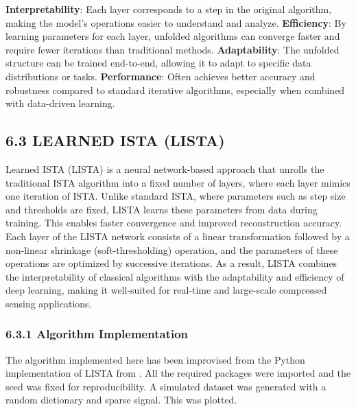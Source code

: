 \documentclass[
  letterpaper,
  DIV=11,
  numbers=noendperiod]{scrartcl}
\begin{document}
\textbf{Interpretability}: Each layer corresponds to a step in the
original algorithm, making the model's operations easier to understand
and analyze. \textbf{Efficiency}: By learning parameters for each layer,
unfolded algorithms can converge faster and require fewer iterations
than traditional methods. \textbf{Adaptability}: The unfolded structure
can be trained end-to-end, allowing it to adapt to specific data
distributions or tasks. \textbf{Performance}: Often achieves better
accuracy and robustness compared to standard iterative algorithms,
especially when combined with data-driven learning.

\subsection{6.3 LEARNED ISTA (LISTA)}\label{learned-ista-lista}

Learned ISTA (LISTA) is a neural network-based approach that unrolls the
traditional ISTA algorithm into a fixed number of layers, where each
layer mimics one iteration of ISTA. Unlike standard ISTA, where
parameters such as step size and thresholds are fixed, LISTA learns
these parameters from data during training. This enables faster
convergence and improved reconstruction accuracy. Each layer of the
LISTA network consists of a linear transformation followed by a
non-linear shrinkage (soft-thresholding) operation, and the parameters
of these operations are optimized by successive iterations. As a result,
LISTA combines the interpretability of classical algorithms with the
adaptability and efficiency of deep learning, making it well-suited for
real-time and large-scale compressed sensing applications.

\subsubsection{6.3.1 Algorithm
Implementation}\label{algorithm-implementation-2}

The algorithm implemented here has been improvised from the Python
implementation of LISTA from
\autocite{shlezinger_modelbaseddeeplearning}. All the required packages
were imported and the seed was fixed for reproducibility. A simulated
dataset was generated with a random dictionary and sparse signal. This
was plotted.
\end{document}
